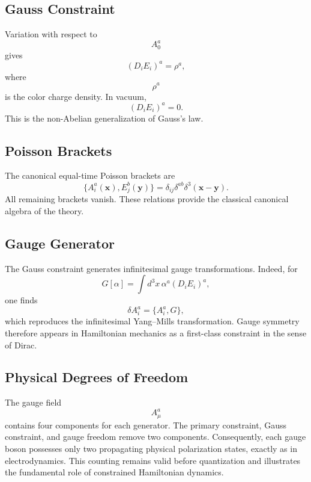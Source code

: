 \subsection{Gauss Constraint}
Variation with respect to
\[A_0^a\]
gives
\[\boxed{(D_iE_i)^a=\rho^a,}\]
where
\[\rho^a\]
is the color charge density.
In vacuum,
\[(D_iE_i)^a=0.\]
This is the non-Abelian generalization of Gauss's law.
\subsection{Poisson Brackets}
The canonical equal-time Poisson brackets are
\[\boxed{\{A_i^a(\mathbf x),E_j^b(\mathbf y)\}=
\delta_{ij}\delta^{ab}\delta^3(\mathbf x-\mathbf y).}\]
All remaining brackets vanish.
These relations provide the classical canonical algebra of the theory.
\subsection{Gauge Generator}
The Gauss constraint generates infinitesimal gauge transformations.
Indeed,
for
\[G[\alpha]=\int d^3x\,\alpha^a(D_iE_i)^a,\]
one finds
\[\delta A_i^a=\{A_i^a,G\},\]
which reproduces the infinitesimal Yang--Mills transformation.
Gauge symmetry therefore appears in Hamiltonian mechanics as a first-class
constraint in the sense of Dirac.
\subsection{Physical Degrees of Freedom}
The gauge field
\[A_\mu^a\]
contains four components for each generator.
The primary constraint,
Gauss constraint,
and gauge freedom remove two components.
Consequently,
each gauge boson possesses only two propagating physical polarization
states,
exactly as in electrodynamics.
This counting remains valid before quantization and illustrates the
fundamental role of constrained Hamiltonian dynamics.
